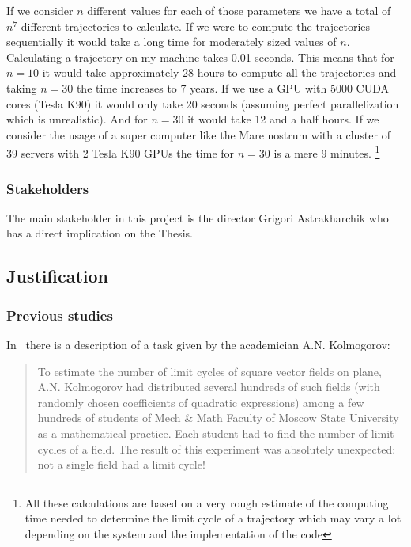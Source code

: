 If we consider $n$ different values for each of those parameters we have a total
of $n^7$ different trajectories to calculate. If we were to compute the
trajectories sequentially it would take a long time for moderately sized values
of $n$. Calculating a trajectory on my machine takes 0.01 seconds. This means
that for $n=10$ it would take approximately 28 hours to compute all the
trajectories and taking $n=30$ the time increases to 7 years. If we use a GPU
with 5000 CUDA cores (Tesla K90) it would only take 20 seconds (assuming perfect
parallelization which is unrealistic). And for $n=30$ it would take 12 and a
half hours. If we consider the usage of a super computer like the Mare nostrum
with a cluster of 39 servers with 2 Tesla K90 GPUs the time for $n=30$ is a mere
9 minutes. \footnote{All these calculations are based on a very rough estimate
of the computing time needed to determine the limit cycle of a trajectory which
may vary a lot depending on the system and the implementation of the code}

\subsubsection{Stakeholders}

The main stakeholder in this project is the director Grigori Astrakharchik who
has a direct implication on the Thesis.

\pagebreak
\subsection{Justification}
\subsubsection{Previous studies}

In~\cite{kuznetsov_visualization_2013} there is a description of a task given by
the academician A.N. Kolmogorov:

\begin{quote}
To estimate the number of limit cycles of square vector fields on plane, A.N. Kolmogorov had
distributed several hundreds of such fields (with randomly chosen coefficients
of quadratic expressions) among a few hundreds of students of Mech \& Math
Faculty of Moscow State University as a mathematical practice. Each student had
to find the number of limit cycles of a field. The result of this experiment was
absolutely unexpected: not a single field had a limit cycle!
\end{quote}


